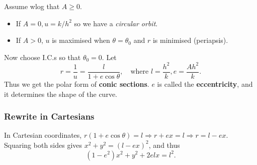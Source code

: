 Assume wlog that $ A\ge 0 $.
\begin{itemize}
    \item If $ A=0,u=k/h^2 $ so we have a \textit{circular orbit}.
    \item If $A>0$, $u$ is maximised when $ \theta=\theta_0 $ and $r$ is minimised (periapsis).
\end{itemize}

Now choose I.C.s so that $ \theta_0=0 $. Let 
\[
    r = \frac{1}{u} = \frac{l}{1+e \cos \theta},\quad \text{where }l=\frac{h^2}{k},e=\frac{Ah^2}{k}.
\]
Thus we get the polar form of \textbf{conic sections}. $e$ is called the \textbf{eccentricity}, and it determines the shape of the curve.
\subsubsection*{Rewrite in Cartesians}
In Cartesian coordinates, $r(1+e\cos\theta)=l \Rightarrow r+ex=l \Rightarrow r=l-ex$. Squaring both sides gives $ x^2+y^2=(l-ex)^2 $, and thus 
\begin{equation}\label{eq:kepler}\tag{$\dagger$}
    (1-e^2)x^2+y^2+2elx = l^2.
\end{equation} 
